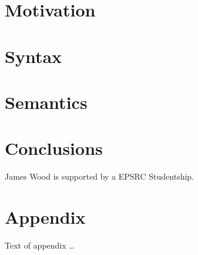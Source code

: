 \documentclass[acmsmall,review,anonymous]{acmart}\settopmatter{printfolios=true,printccs=false,printacmref=false}
\begin{document}
\section{Motivation}
\label{sec:motivation}


\section{Syntax}
\label{sec:syntax}


\section{Semantics}
\label{sec:semantics}


\section{Conclusions}
\label{sec:future-work}



\begin{acks}                            %
  James Wood is supported by a EPSRC Studentship.
\end{acks}





\appendix
\section{Appendix}

Text of appendix \ldots
\end{document}
